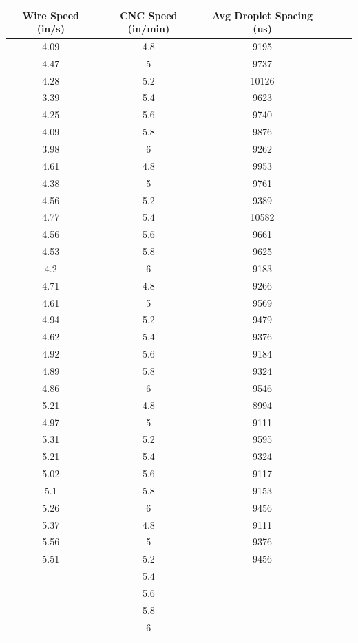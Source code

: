 \documentclass[12pt]{article}
\begin{document}
\clearpage


\begin{center}

\begin{tabular}{ |c|c|c|c|c|c| }


  \hline
  \textbf{Wire Speed (in/s)} & \textbf{CNC Speed (in/min)} & \textbf{Avg Droplet Spacing (us)} \\ \hline
  
4.09 &	4.8 &	9195 \\ \hline
4.47 &	5 &	9737 \\ \hline
4.28 &	5.2 &	10126 \\ \hline
3.39 &	5.4 &	9623 \\ \hline
4.25 &	5.6 &	9740 \\ \hline
4.09 &	5.8 &	9876 \\ \hline
3.98 &	6 &	9262 \\ \hline \hline
4.61 &	4.8 &	9953 \\ \hline
4.38 &	5 &	9761 \\ \hline
4.56 &	5.2 &	9389 \\ \hline
4.77 &	5.4 &	10582 \\ \hline
4.56 &	5.6 &	9661 \\ \hline
4.53 &	5.8 &	9625 \\ \hline
4.2 &	6 &	9183 \\ \hline \hline
4.71 &	4.8 &	9266 \\ \hline
4.61 &	5 &	9569 \\ \hline
4.94 &	5.2 &	9479 \\ \hline
4.62 &	5.4 &	9376 \\ \hline
4.92 &	5.6 &	9184 \\ \hline
4.89 &	5.8 &	9324 \\ \hline
4.86 &	6 &	9546 \\ \hline \hline
5.21 &	4.8 &	8994 \\ \hline
4.97 &	5 &	9111 \\ \hline
5.31 &	5.2 &	9595 \\ \hline
5.21 &	5.4 &	9324 \\ \hline
5.02 &	5.6 &	9117 \\ \hline
5.1 &	5.8 &	9153 \\ \hline
5.26 &	6 &	9456 \\ \hline \hline
5.37 &	4.8 &	9111 \\ \hline
5.56 &	5 &	9376 \\ \hline
5.51 &	5.2 &	9456 \\ \hline
	& 5.4	 & \\ \hline
	& 5.6 & \\ \hline	
	& 5.8 & \\ \hline	
	& 6 & \\ \hline	




 
\end{tabular}


\end{center}
\end{document}
